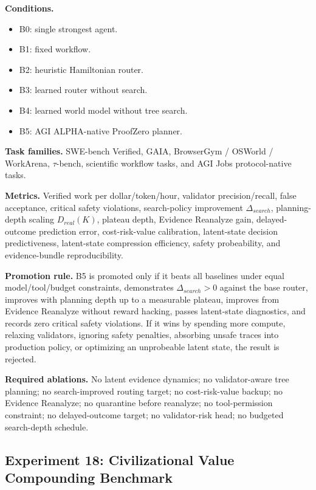 \documentclass[11pt]{article}
\providecommand{\tightlist}{\setlength{\itemsep}{0pt}\setlength{\parskip}{0pt}}
\begin{document}
\textbf{Conditions.}

\begin{itemize}
\tightlist
\item
  B0: single strongest agent.
\item
  B1: fixed workflow.
\item
  B2: heuristic Hamiltonian router.
\item
  B3: learned router without search.
\item
  B4: learned world model without tree search.
\item
  B5: AGI ALPHA-native ProofZero planner.
\end{itemize}

\textbf{Task families.} SWE-bench Verified, GAIA, BrowserGym / OSWorld / WorkArena, \(\tau\)-bench, scientific workflow tasks, and AGI Jobs protocol-native tasks.

\textbf{Metrics.} Verified work per dollar/token/hour, validator precision/recall, false acceptance, critical safety violations, search-policy improvement \(\Delta_{search}\), planning-depth scaling \(D_{real}(K)\), plateau depth, Evidence Reanalyze gain, delayed-outcome prediction error, cost-risk-value calibration, latent-state decision predictiveness, latent-state compression efficiency, safety probeability, and evidence-bundle reproducibility.

\textbf{Promotion rule.} B5 is promoted only if it beats all baselines under equal model/tool/budget constraints, demonstrates \(\Delta_{search}>0\) against the base router, improves with planning depth up to a measurable plateau, improves from Evidence Reanalyze without reward hacking, passes latent-state diagnostics, and records zero critical safety violations. If it wins by spending more compute, relaxing validators, ignoring safety penalties, absorbing unsafe traces into production policy, or optimizing an unprobeable latent state, the result is rejected.

\textbf{Required ablations.} No latent evidence dynamics; no validator-aware tree planning; no search-improved routing target; no cost-risk-value backup; no Evidence Reanalyze; no quarantine before reanalyze; no tool-permission constraint; no delayed-outcome target; no validator-risk head; no budgeted search-depth schedule.

\subsection{Experiment 18: Civilizational Value Compounding Benchmark}\label{experiment-18-civilizational-value-compounding-benchmark}
\end{document}
